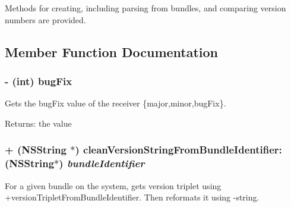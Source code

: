 Methods for creating, including parsing from bundles, and comparing version numbers are provided. 

\subsection{Member Function Documentation}
\hypertarget{interface_s_s_y_version_triplet_314e1db1e768f717d5c088c41facac60}{
\subsubsection[{bugFix}]{\setlength{\rightskip}{0pt plus 5cm}- (int) bugFix }}
\label{interface_s_s_y_version_triplet_314e1db1e768f717d5c088c41facac60}


Gets the bugFix value of the receiver \{major,minor,bugFix\}. 

\begin{Desc}
\item[Returns:]the value \end{Desc}
\hypertarget{interface_s_s_y_version_triplet_5ec1d2dd6be65ebe2c05161d417e995e}{
\subsubsection[{cleanVersionStringFromBundleIdentifier:}]{\setlength{\rightskip}{0pt plus 5cm}+ (NSString $\ast$) cleanVersionStringFromBundleIdentifier: (NSString$\ast$) {\em bundleIdentifier}}}
\label{interface_s_s_y_version_triplet_5ec1d2dd6be65ebe2c05161d417e995e}


For a given bundle on the system, gets version triplet using +versionTripletFromBundleIdentifier. Then reformats it using -string. 

